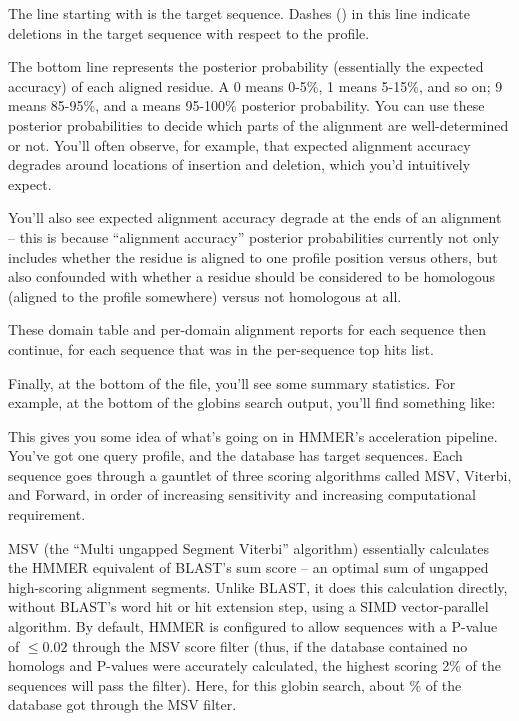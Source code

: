 The line starting with  is the target sequence.
Dashes (\mono{-}) in this line indicate deletions in the target
sequence with respect to the profile.

The bottom line represents the posterior
probability (essentially the expected accuracy) of each aligned
residue. A 0 means 0-5\%, 1 means 5-15\%, and so on; 9 means 85-95\%,
and a \mono{*} means 95-100\% posterior probability. You can use these
posterior probabilities to decide which parts of the alignment are
well-determined or not. You'll often observe, for example, that
expected alignment accuracy degrades around locations of insertion and
deletion, which you'd intuitively expect. 

You'll also see expected alignment accuracy degrade at the ends of an
alignment -- this is because ``alignment accuracy'' posterior
probabilities currently not only includes whether the residue is
aligned to one profile position versus others, but also confounded with
whether a residue should be considered to be homologous (aligned to
the profile somewhere) versus not homologous at all.


These domain table and per-domain alignment reports for each sequence
then continue, for each sequence that was in the per-sequence top hits
list.

Finally, at the bottom of the file, you'll see some summary
statistics.  For example, at the bottom of the globins search output,
you'll find something like:


This gives you some idea of what's going on in HMMER's acceleration
pipeline. You've got one query profile, and the database has \UNInseq{}
target sequences. Each sequence goes through a gauntlet of three
scoring algorithms called MSV, Viterbi, and Forward, in order of 
increasing sensitivity and increasing computational requirement. 

MSV (the ``Multi ungapped Segment Viterbi'' algorithm) essentially
calculates the HMMER equivalent of BLAST's sum score -- an optimal sum
of ungapped high-scoring alignment segments. Unlike BLAST, it does
this calculation directly, without BLAST's word hit or hit extension
step, using a SIMD vector-parallel algorithm. By default, HMMER is
configured to allow sequences with a P-value of $\leq 0.02$ through
the MSV score filter (thus, if the database contained no homologs and
P-values were accurately calculated, the highest scoring 2\% of the
sequences will pass the filter). Here, for this globin search, about
\SGUmsvpass{}\% of the database got through the MSV filter.

